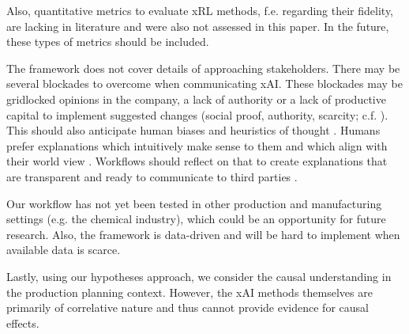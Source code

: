 Also, quantitative metrics to evaluate xRL methods, f.e. regarding their fidelity, are lacking in literature  and were also not assessed in this paper. In the future, these types of metrics should be included.

The framework does not cover details of approaching stakeholders. There may be several blockades to overcome when communicating xAI. These blockades may be gridlocked opinions in the company, a lack of authority or a lack of productive capital to implement suggested changes (social proof, authority, scarcity; c.f. ). This should also anticipate human biases and heuristics of thought . Humans prefer explanations which intuitively make sense to them and which align with their world view . Workflows should reflect on that to create explanations that are transparent and ready to communicate to third parties .

Our workflow has not yet been tested in other production and manufacturing settings (e.g. the chemical industry), which could be an opportunity for future research. Also, the framework is data-driven and will be hard to implement when available data is scarce.

Lastly, using our hypotheses approach, we consider the causal understanding in the production planning context. However, the xAI methods themselves are primarily of correlative nature and thus cannot provide evidence for causal effects.